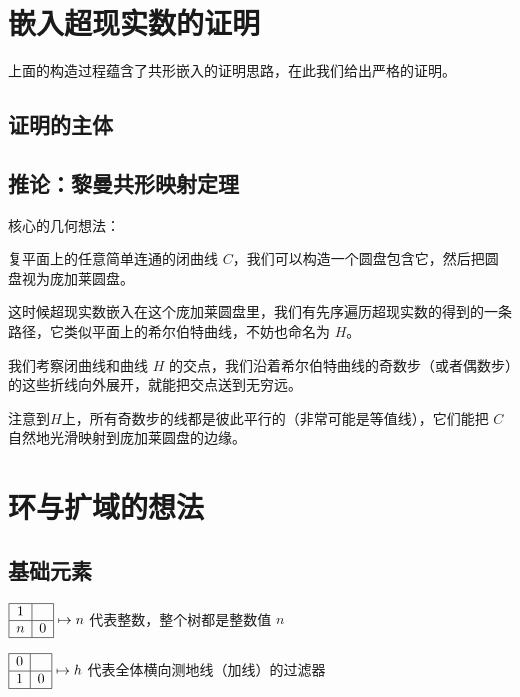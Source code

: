 \documentclass[a4paper,12pt]{article}
\begin{document}
\newpage

\section{嵌入超现实数的证明}

上面的构造过程蕴含了共形嵌入的证明思路，在此我们给出严格的证明。

\subsection{证明的主体}

\subsection{推论：黎曼共形映射定理}

核心的几何想法：

复平面上的任意简单连通的闭曲线 $C$，我们可以构造一个圆盘包含它，然后把圆盘视为庞加莱圆盘。

这时候超现实数嵌入在这个庞加莱圆盘里，我们有先序遍历超现实数的得到的一条路径，它类似平面上的希尔伯特曲线，不妨也命名为 $H$。

我们考察闭曲线和曲线 $H$ 的交点，我们沿着希尔伯特曲线的奇数步（或者偶数步）的这些折线向外展开，就能把交点送到无穷远。

注意到$H$上，所有奇数步的线都是彼此平行的（非常可能是等值线），它们能把 $C$ 自然地光滑映射到庞加莱圆盘的边缘。

\newpage

\section{环与扩域的想法}

\subsection{基础元素}

$\begin{array}{|c|c|}\hline 1&\space\\\hline n&0\\\hline\end{array} \mapsto n$ 代表整数，整个树都是整数值 $n$

$\begin{array}{|c|c|}\hline0&\space\\\hline 1&0\\\hline\end{array} \mapsto h$ 代表全体横向测地线（加线）的过滤器
\end{document}
